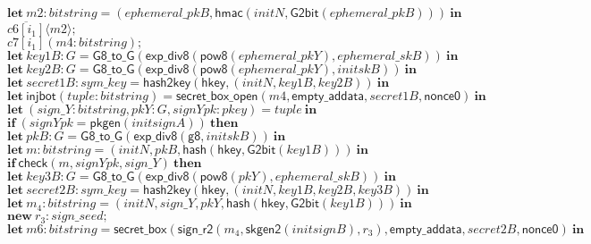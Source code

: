 \documentclass{article}
\newcommand{\cinput}[2]{{#1}({#2})}
\newcommand{\coutput}[2]{\overline{#1}\langle{#2}\rangle}
\newcommand{\kw}[1]{\mathbf{#1}}
\newcommand{\kwf}[1]{\mathsf{#1}}
\newcommand{\var}[1]{\mathit{#1}}
\newcommand{\kwt}[1]{\mathit{#1}}
\newcommand{\kwc}[1]{\mathit{#1}}
\begin{document}
\begin{tabbing}
\>$\quad \kw{let}\ \var{m2}: \kwt{bitstring} = \kwf{}(\var{ephemeral{\_}pkB}, \kwf{hmac}(\var{initN}, \kwf{G2bit}(\var{ephemeral{\_}pkB})))\ \kw{in}$\\
\>$\quad \coutput{\kwc{c6}[\var{i}_{1}]}{\var{m2}};$\\
\>$\quad \cinput{\kwc{c7}[\var{i}_{1}]}{\var{m4}: \kwt{bitstring}};$\\
\>$\quad \kw{let}\ \var{key1B}: \kwt{G} = \kwf{G8{\_}to{\_}G}(\kwf{exp{\_}div8}(\kwf{pow8}(\var{ephemeral{\_}pkY}), \var{ephemeral{\_}skB}))\ \kw{in}$\\
\>$\quad \kw{let}\ \var{key2B}: \kwt{G} = \kwf{G8{\_}to{\_}G}(\kwf{exp{\_}div8}(\kwf{pow8}(\var{ephemeral{\_}pkY}), \var{initskB}))\ \kw{in}$\\
\>$\quad \kw{let}\ \var{secret1B}: \kwt{sym{\_}key} = \kwf{hash2key}(\kwf{hkey}, \kwf{}(\var{initN}, \var{key1B}, \var{key2B}))\ \kw{in}$\\
\>$\quad \kw{let}\ \kwf{injbot}(\var{tuple}: \kwt{bitstring}) = \kwf{secret{\_}box{\_}open}(\var{m4}, \kwf{empty{\_}addata}, \var{secret1B}, \kwf{nonce0})\ \kw{in}$\\
\>$\quad \kw{let}\ \kwf{}(\var{sign{\_}Y}: \kwt{bitstring}, \var{pkY}: \kwt{G}, \var{signYpk}: \kwt{pkey}) = \var{tuple}\ \kw{in}$\\
\>$\quad \kw{if}\ (\var{signYpk}  =  \kwf{pkgen}(\var{initsignA}))\ \kw{then}$\\
\>$\quad \kw{let}\ \var{pkB}: \kwt{G} = \kwf{G8{\_}to{\_}G}(\kwf{exp{\_}div8}(\kwf{g8}, \var{initskB}))\ \kw{in}$\\
\>$\quad \kw{let}\ \var{m}: \kwt{bitstring} = \kwf{}(\var{initN}, \var{pkB}, \kwf{hash}(\kwf{hkey}, \kwf{G2bit}(\var{key1B})))\ \kw{in}$\\
\>$\quad \kw{if}\ \kwf{check}(\var{m}, \var{signYpk}, \var{sign{\_}Y})\ \kw{then}$\\
\>$\quad \kw{let}\ \var{key3B}: \kwt{G} = \kwf{G8{\_}to{\_}G}(\kwf{exp{\_}div8}(\kwf{pow8}(\var{pkY}), \var{ephemeral{\_}skB}))\ \kw{in}$\\
\>$\quad \kw{let}\ \var{secret2B}: \kwt{sym{\_}key} = \kwf{hash2key}(\kwf{hkey}, \kwf{}(\var{initN}, \var{key1B}, \var{key2B}, \var{key3B}))\ \kw{in}$\\
\>$\quad \kw{let}\ \var{m}_{4}: \kwt{bitstring} = \kwf{}(\var{initN}, \var{sign{\_}Y}, \var{pkY}, \kwf{hash}(\kwf{hkey}, \kwf{G2bit}(\var{key1B})))\ \kw{in}$\\
\>$\quad \kw{new}\ \var{r}_{3}: \kwt{sign{\_}seed};$\\
\>$\quad \kw{let}\ \var{m6}: \kwt{bitstring} = \kwf{secret{\_}box}(\kwf{sign{\_}r2}(\var{m}_{4}, \kwf{skgen2}(\var{initsignB}), \var{r}_{3}), \kwf{empty{\_}addata}, \var{secret2B}, \kwf{nonce0})\ \kw{in}$\\

\end{tabbing}
\end{document}
